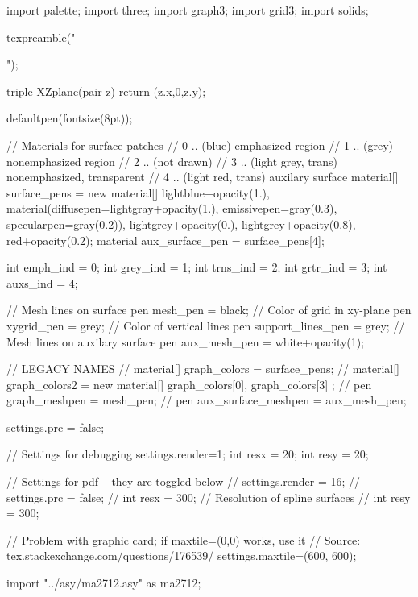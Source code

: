 \begin{asydef}
import palette;
import three;
import graph3;
import grid3;
import solids;

texpreamble("\usepackage[charter,expert]{mathdesign}");

triple XZplane(pair z) {return (z.x,0,z.y);}

defaultpen(fontsize(8pt));

// Materials for surface patches
// 0 .. (blue)                emphasized region
// 1 .. (grey)                nonemphasized region
// 2 .. (not drawn)
// 3 .. (light grey, trans)   nonemphasized, transparent
// 4 .. (light red, trans)    auxilary surface
material[] surface_pens =
	new material[] {lightblue+opacity(1.),
									material(diffusepen=lightgray+opacity(1.), 
													 emissivepen=gray(0.3),
													 specularpen=gray(0.2)),
									lightgrey+opacity(0.),
									lightgrey+opacity(0.8),
									red+opacity(0.2)};
material aux_surface_pen = surface_pens[4];

int emph_ind = 0;
int grey_ind = 1;
int trns_ind = 2;
int grtr_ind = 3;
int auxs_ind = 4;

// Mesh lines on surface
pen mesh_pen = black;
// Color of grid in xy-plane
pen xygrid_pen = grey;
// Color of vertical lines
pen support_lines_pen = grey;
// Mesh lines on auxilary surface
pen aux_mesh_pen = white+opacity(1);

// LEGACY NAMES
// material[] graph_colors = surface_pens;
// material[] graph_colors2 = new material[] { graph_colors[0], graph_colors[3] };
// pen graph_meshpen = mesh_pen;
// pen aux_surface_meshpen = aux_mesh_pen;

settings.prc = false;

// Settings for debugging
settings.render=1;
int resx = 20;
int resy = 20;

// Settings for pdf -- they are toggled below
// settings.render = 16;
// settings.prc = false;
// int resx = 300; // Resolution of spline surfaces
// int resy = 300;

// Problem with graphic card; if maxtile=(0,0) works, use it
// Source: tex.stackexchange.com/questions/176539/
settings.maxtile=(600, 600); 

import "../asy/ma2712.asy" as ma2712;
\end{asydef}

\newif\ifasyhighres
\asyhighresfalse


\ifasyhighres
\begin{asydef}
settings.render = 16;
int resx = 300;
int resy = 300;
\end{asydef}
\fi

